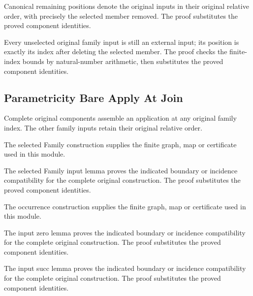 Canonical remaining positions denote the original inputs in their
original relative order, with precisely the selected member removed.
The proof substitutes the proved component identities.
\par{}

Every unselected original family input is still an external input;
its position is exactly its index after deleting the selected member.
The proof checks the finite-index bounds by natural-number arithmetic, then substitutes the proved component identities.
\par{}

\subsection{Parametricity Bare Apply At Join}
Complete original components assemble an application at any original
family index. The other family inputs retain their original relative order.

The selected Family construction supplies the finite graph, map or certificate used in this module.
\par{}

The selected Family input lemma proves the indicated boundary or incidence compatibility for the complete original construction.
The proof substitutes the proved component identities.
\par{}

The occurrence construction supplies the finite graph, map or certificate used in this module.
\par{}

The input zero lemma proves the indicated boundary or incidence compatibility for the complete original construction.
The proof substitutes the proved component identities.
\par{}

The input succ lemma proves the indicated boundary or incidence compatibility for the complete original construction.
The proof substitutes the proved component identities.
\par{}

